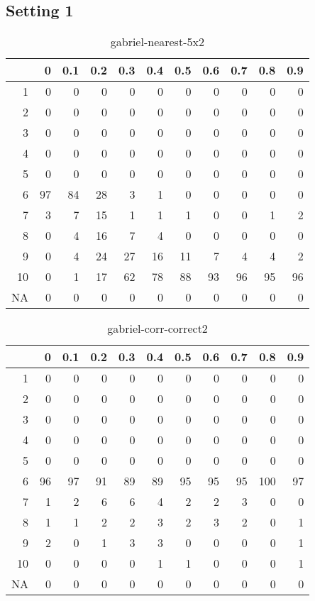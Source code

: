 \documentclass[11pt]{article}
\begin{document}
\subsection{Setting 1}
\begin{table}[H]
\centering
\begin{tabular}{rrrrrrrrrrr}
  \hline
 & 0 & 0.1 & 0.2 & 0.3 & 0.4 & 0.5 & 0.6 & 0.7 & 0.8 & 0.9 \\ 
  \hline
1 & 0 & 0 & 0 & 0 & 0 & 0 & 0 & 0 & 0 & 0 \\ 
  2 & 0 & 0 & 0 & 0 & 0 & 0 & 0 & 0 & 0 & 0 \\ 
  3 & 0 & 0 & 0 & 0 & 0 & 0 & 0 & 0 & 0 & 0 \\ 
  4 & 0 & 0 & 0 & 0 & 0 & 0 & 0 & 0 & 0 & 0 \\ 
  5 & 0 & 0 & 0 & 0 & 0 & 0 & 0 & 0 & 0 & 0 \\ 
  6 & 97 & 84 & 28 & 3 & 1 & 0 & 0 & 0 & 0 & 0 \\ 
  7 & 3 & 7 & 15 & 1 & 1 & 1 & 0 & 0 & 1 & 2 \\ 
  8 & 0 & 4 & 16 & 7 & 4 & 0 & 0 & 0 & 0 & 0 \\ 
  9 & 0 & 4 & 24 & 27 & 16 & 11 & 7 & 4 & 4 & 2 \\ 
  10 & 0 & 1 & 17 & 62 & 78 & 88 & 93 & 96 & 95 & 96 \\ 
  NA & 0 & 0 & 0 & 0 & 0 & 0 & 0 & 0 & 0 & 0 \\ 
   \hline
\end{tabular}
\caption{gabriel-nearest-5x2} 
\end{table}
\begin{table}[H]
\centering
\begin{tabular}{rrrrrrrrrrr}
  \hline
 & 0 & 0.1 & 0.2 & 0.3 & 0.4 & 0.5 & 0.6 & 0.7 & 0.8 & 0.9 \\ 
  \hline
1 & 0 & 0 & 0 & 0 & 0 & 0 & 0 & 0 & 0 & 0 \\ 
  2 & 0 & 0 & 0 & 0 & 0 & 0 & 0 & 0 & 0 & 0 \\ 
  3 & 0 & 0 & 0 & 0 & 0 & 0 & 0 & 0 & 0 & 0 \\ 
  4 & 0 & 0 & 0 & 0 & 0 & 0 & 0 & 0 & 0 & 0 \\ 
  5 & 0 & 0 & 0 & 0 & 0 & 0 & 0 & 0 & 0 & 0 \\ 
  6 & 96 & 97 & 91 & 89 & 89 & 95 & 95 & 95 & 100 & 97 \\ 
  7 & 1 & 2 & 6 & 6 & 4 & 2 & 2 & 3 & 0 & 0 \\ 
  8 & 1 & 1 & 2 & 2 & 3 & 2 & 3 & 2 & 0 & 1 \\ 
  9 & 2 & 0 & 1 & 3 & 3 & 0 & 0 & 0 & 0 & 1 \\ 
  10 & 0 & 0 & 0 & 0 & 1 & 1 & 0 & 0 & 0 & 1 \\ 
  NA & 0 & 0 & 0 & 0 & 0 & 0 & 0 & 0 & 0 & 0 \\ 
   \hline
\end{tabular}
\caption{gabriel-corr-correct2} 
\end{table}
\end{document}
